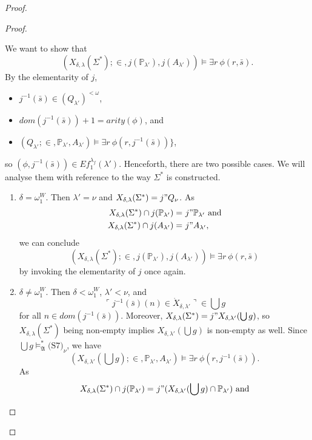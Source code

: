 \documentclass[12pt]{article}
\numberwithin{equation}{section}
\begin{document}
\begin{proof}
\begin{proof}
\begin{enumerate}[label=<$k$> $\eq$ \arabic* :, leftmargin=70pt]
\begin{itemize}
    \end{itemize}
    We want to show that $$(X_{\delta, \lambda}(\Sigma^*); \in, j(\mathbb{P}_{\lambda'}), j(A_{\lambda'})) \models \exists r \ \phi(r, \bar{s}).$$ By the elementarity of $j$, 
    \begin{itemize}
        \item $j^{-1}(\bar{s}) \in (Q_{\lambda'})^{< \omega}$, 
        \item $dom(j^{-1}(\bar{s})) + 1 = arity(\phi)$, and
        \item $(Q_{\lambda'}; \in, \mathbb{P}_{\lambda'}, A_{\lambda'}) \models \exists r \ \phi(r, j^{-1}(\bar{s}))\}$,
    \end{itemize}
    so $(\phi, j^{-1}(\bar{s})) \in Ef_1^{\lambda_f}(\lambda')$. Henceforth, there are two possible cases. We will analyse them with reference to the way $\Sigma^*$ is constructed. 
    \begin{enumerate}[label=Case \arabic*:, leftmargin=50pt]
        \item\label{c7c1} $\delta = \omega_1^W$. Then $\lambda' = \nu$ and $X_{\delta, \lambda}(\Sigma^*) = j" Q_{\nu}$. As 
        \begin{align*}
            X_{\delta, \lambda}(\Sigma^*) \cap j(\mathbb{P}_{\lambda'}) = \ & j" \mathbb{P}_{\lambda'} \text{ and} \\
            X_{\delta, \lambda}(\Sigma^*) \cap j(A_{\lambda'}) = \ & j" A_{\lambda'},
        \end{align*}
        we can conclude $$(X_{\delta, \lambda}(\Sigma^*); \in, j(\mathbb{P}_{\lambda'}), j(A_{\lambda'})) \models \exists r \ \phi(r, \bar{s})$$ by invoking the elementarity of $j$ once again.
        \item $\delta \neq \omega_1^W$. Then $\delta < \omega_1^W$, $\lambda' < \nu$, and $$\ulcorner j^{-1}(\bar{s})(n) \in \dot{X}_{\delta, \lambda'} \urcorner \in \bigcup g$$ for all $n \in dom(j^{-1}(\bar{s}))$. Moreover, $X_{\delta, \lambda}(\Sigma^*) = j" X_{\delta, \lambda'}(\bigcup g)$, so $X_{\delta, \lambda}(\Sigma^*)$ being non-empty implies $X_{\delta, \lambda'}(\bigcup g)$ is non-empty as well. Since $\bigcup g \models^*_{\mathfrak{A}} \text{(S7)}_{\nu}$, we have $$(X_{\delta, \lambda'}(\bigcup g); \in, \mathbb{P}_{\lambda'}, A_{\lambda'}) \models \exists r \ \phi(r, j^{-1}(\bar{s})).$$ As 
        \begin{align*}
            X_{\delta, \lambda}(\Sigma^*) \cap j(\mathbb{P}_{\lambda'}) = \ & j" (X_{\delta, \lambda'}(\bigcup g) \cap \mathbb{P}_{\lambda'}) \text{ and} \\

\end{align*}
\end{enumerate}
\end{enumerate}
\end{proof}
\end{proof}
\end{document}
